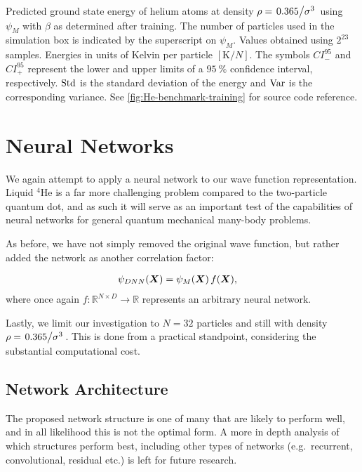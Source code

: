 \documentclass[Thesis.tex]{subfiles}
\begin{document}
\begin{table}[h]
  \centering
  \caption[Energy estimates of McMillan wave function on
$^4$He]{\label{tab:He-benchmark-results}Predicted ground state energy of helium
atoms at density $\rho = \flatfrac{0.365}{\sigma^3}$ using $\psi_{M}$ with
$\beta$ as determined after training. The number of particles used in the
simulation box is indicated by the superscript on $\psi_M$. Values obtained
using $2^{23}$ samples. Energies in units of Kelvin per particle
$[\si{\kelvin\per N}]$. The symbols $CI_{-}^{95}$ and $CI_{+}^{95}$ represent
the lower and upper limits of a $\SI{95}{\percent}$ confidence interval, respectively. $\operatorname{Std}$
is the standard deviation of the energy and $\operatorname{Var}$ is the corresponding
variance. See \cref{fig:He-benchmark-training} for source code
reference.}
  
\end{table}
\clearpage


\section{Neural Networks}

We again attempt to apply a neural network to our wave function representation.
Liquid $^4$He is a far more challenging problem compared to the two-particle
quantum dot, and as such it will serve as an important test of the capabilities
of neural networks for general quantum mechanical many-body problems.

As before, we have not simply removed the original wave function, but rather
added the network as another correlation factor:

\begin{align}
  \label{eq:helium-dnn-mcmillan-def}
  \psi_{DNN}(\bm{X}) &= \psi_M(\bm{X})\,f(\bm{X}),
\end{align}
where once again $f: \mathbb{R}^{N\times D}\to\mathbb{R}$ represents an
arbitrary neural network.

Lastly, we limit our investigation to $N=32$ particles and still with density
$\rho=\flatfrac{0.365}{\sigma^3}$. This is done from a practical standpoint,
considering the substantial computational cost.

\subsection{Network Architecture}

The proposed network structure is one of many that are likely to perform well,
and in all likelihood this is not the optimal form. A more in depth analysis of
which structures perform best, including other types of networks (e.g.\ recurrent,
convolutional, residual etc.) is left for future research.
\end{document}
